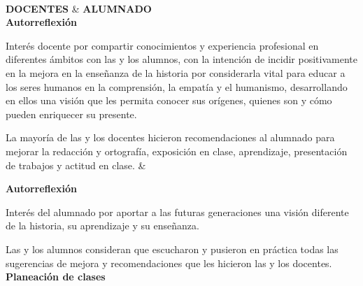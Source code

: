 \begin{center}
\begin{tiny}
\begin{longtabu*}
 \\ \midrule %
\toprule
{}\textbf{DOCENTES} & \textbf{ALUMNADO}\\ 
\midrule
\endhead%
\bottomrule
{} %
\endfoot%
%
\midrule\endlastfoot%
 \textbf{Autorreflexión} 

Interés docente por compartir conocimientos y experiencia profesional 
en diferentes ámbitos con las y los alumnos, con la intención de 
incidir positivamente en la mejora en la enseñanza de la historia por 
considerarla vital para educar a los seres humanos en la comprensión, 
la empatía y el humanismo, desarrollando en ellos una visión que les 
permita conocer sus orígenes, quienes son y cómo pueden enriquecer su 
presente. 

La mayoría de las y los docentes hicieron recomendaciones al alumnado
para mejorar la redacción y ortografía, exposición en clase, aprendizaje, 
presentación de trabajos y actitud en clase. 
&

{\bfseries Autorreflexión}

Interés del alumnado por aportar a las futuras generaciones una visión
diferente de la historia, su aprendizaje y su enseñanza.

Las y los alumnos consideran que escucharon y pusieron en práctica
todas las sugerencias de mejora y recomendaciones que les hicieron las y los 
docentes.\\
\addlinespace
{} {\bf Planeación de clases}


\end{longtabu*}
\end{tiny}
\end{center}
